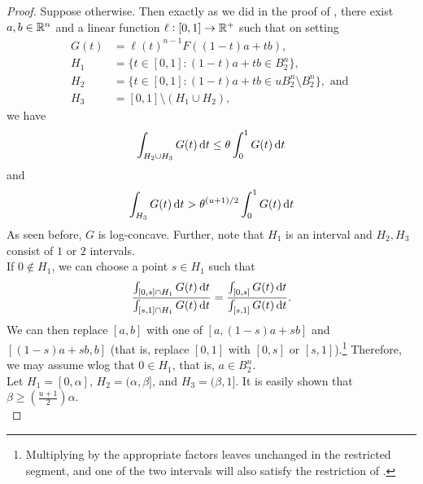 \begin{proof}
	Suppose otherwise. Then exactly as we did in the proof of , there exist $a,b\in\mathbb{R}^n$ and a linear function $\ell:[0,1]\to\mathbb{R}^+$ such that on setting
	\begin{align*}
		G(t) &= \ell(t)^{n-1}F((1-t)a+tb),\\
		H_1 &= \{t\in[0,1]: (1-t)a+tb\in B_2^n\},\\
		H_2 &= \{t\in[0,1]: (1-t)a+tb\in uB_2^n\setminus B_2^n\},\text{ and }\\
		H_3 &= [0,1]\setminus(H_1\cup H_2),
	\end{align*}
	we have
	\begin{equation}
	\label{eqn: 4.16}
		\int_{H_2\cup H_3} G(t)\operatorname{d}\!{t} \leq \theta\int_0^1 G(t)\operatorname{d}\!{t}
	\end{equation}
	and
	\begin{equation}
	\label{eqn: 4.17}
		\int_{H_3} G(t)\operatorname{d}\!{t} > \theta^{(u+1)/2}\int_0^1 G(t)\operatorname{d}\!{t}
	\end{equation}
	As seen before, $G$ is log-concave. Further, note that $H_1$ is an interval and $H_2,H_3$ consist of $1$ or $2$ intervals.\\

	If $0\not\in H_1$, we can choose a point $s\in H_1$ such that
	\[ \frac{\int_{[0,s]\cap H_1} G(t)\operatorname{d}\!{t}}{\int_{[s,1]\cap H_1} G(t)\operatorname{d}\!{t}} = \frac{\int_{[0,s]} G(t)\operatorname{d}\!{t}}{\int_{[s,1]} G(t)\operatorname{d}\!{t}}. \]
	We can then replace $[a,b]$ with one of $[a,(1-s)a+sb]$ and $[(1-s)a+sb,b]$ (that is, replace $[0,1]$ with $[0,s]$ or $[s,1]$).\footnote{Multiplying by the appropriate factors leaves  unchanged in the restricted segment, and one of the two intervals will also satisfy the restriction of .} Therefore, we may assume wlog that $0\in H_1$, that is, $a\in B_2^n$.\\
	Let $H_1=[0,\alpha]$, $H_2=(\alpha,\beta]$, and $H_3=(\beta,1]$. It is easily shown that $\beta \geq (\frac{u+1}{2})\alpha$.\\


\end{proof}
